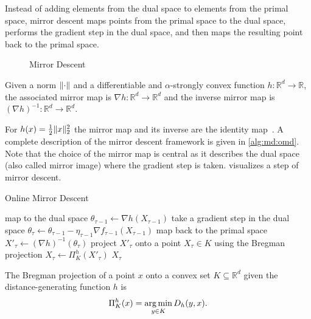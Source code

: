 Instead of adding elements from the dual space to elements from the primal space, mirror descent maps points from the primal space to the dual space, performs the gradient step in the dual space, and then maps the resulting point back to the primal space.

\begin{figure}
    \centering
    [TODO]
    \caption{Mirror Descent}
    \label{fig:mirror_descent}
\end{figure}

\begin{definition}
\cite{Gupta2020} Given a norm $\lVert\cdot\rVert$ and a differentiable and $\alpha$-strongly convex function $h : \mathbb{R}^d \to \mathbb{R}$, the associated mirror map is $\nabla h : \mathbb{R}^d \to \mathbb{R}^d$ and the inverse mirror map is $(\nabla h)^{-1} : \mathbb{R}^d \to \mathbb{R}^d$.
\end{definition}

For $h(x) = \frac{1}{2} \lVert x\rVert_2^2$ the mirror map and its inverse are the identity map~\cite{Gupta2020}. A complete description of the mirror descent framework is given in \cref{alg:md:omd}. Note that the choice of the mirror map is central as it describes the dual space (also called mirror image) where the gradient step is taken.  visualizes a step of mirror descent.

\begin{algorithm}
    \caption{Online Mirror Descent~\cite{Gupta2020}}\label{alg:md:omd}
    map to the dual space $\theta_{\tau-1} \gets \nabla h (X_{\tau-1})$\;
    take a gradient step in the dual space $\theta_{\tau} \gets \theta_{\tau-1} - \eta_{\tau-1} \nabla f_{\tau-1}(X_{\tau-1})$\;
    map back to the primal space $X'_{\tau} \gets (\nabla h)^{-1}(\theta_{\tau})$\;
    project $X'_{\tau}$ onto a point $X_{\tau} \in K$ using the Bregman projection $X_{\tau} \gets \Pi_K^h(X'_{\tau})$\;
    \Return $X_{\tau}$\;
\end{algorithm}

\begin{definition}
\cite{Gupta2020} The Bregman projection of a point $x$ onto a convex set $K \subseteq \mathbb{R}^d$ given the distance-generating function $h$ is \begin{align*}
    \Pi_K^h(x) = \operatorname*{arg\,min}_{y \in K} D_h(y,x).
\end{align*}
\end{definition}

